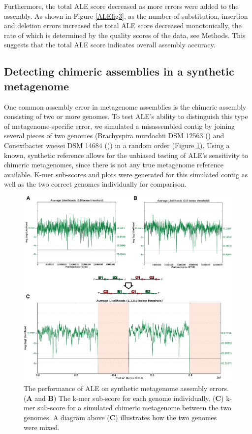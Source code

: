 \documentclass[phd,tocprelim]{cornell}
\begin{document}
Furthermore, the total ALE score decreased as more errors were added to the assembly. As shown in Figure \ref{ALEfig3}, as the number of substitution, insertion and deletion errors increased the total ALE score decreased monotonically, the rate of which is determined by the quality scores of the data, see Methods. This suggests that the total ALE score indicates overall assembly accuracy.

\subsection{Detecting chimeric assemblies in a synthetic metagenome}
One common assembly error in metagenome assemblies is the chimeric assembly consisting of two or more genomes. To test ALE's ability to distinguish this type of metagenome-specific error, we simulated a misassembled contig by joining several pieces of two genomes (Brachyspira murdochii DSM 12563 (\cite{Pati2010}) and Conexibacter woesei DSM 14684 (\cite{Pukall2010})) in a random order (Figure \ref{ALEfig4}).  Using a known, synthetic reference allows for the unbiased testing of ALE's sensitivity to chimeric metagenomes, since there is not any true metagenome reference available. K-mer sub-scores and plots were generated for this simulated contig as well as the two correct genomes individually for comparison.

\begin{figure}[!tpb]%
    \centerline{\includegraphics[width=\textwidth]{figures/ALE/Clark_Fig4b.png}}
    \caption[ALE performance on synthetic metagenome]{The performance of ALE on synthetic metagenome assembly errors. ({\bf A} and {\bf B}) The k-mer sub-score for each genome individually. ({\bf C}) k-mer sub-score for a simulated chimeric metagenome between the two genomes. A diagram above ({\bf C}) illustrates how the two genomes were mixed.}\label{ALEfig4}
\end{figure}
\end{document}
